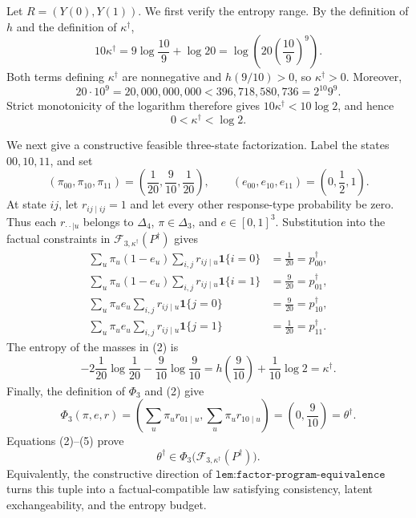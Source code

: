 Let \(R=(Y(0),Y(1))\).  We first verify the entropy range.  By the definition of \(h\) and the definition of \(\kappa^\dagger\),
\[
10\kappa^\dagger
=9\log\frac{10}{9}+\log 20
=\log\!\left(20\left(\frac{10}{9}\right)^9\right).
\]
Both terms defining \(\kappa^\dagger\) are nonnegative and \(h(9/10)>0\), so \(\kappa^\dagger>0\).  Moreover,
\[
20\cdot 10^9=20{,}000{,}000{,}000
<396{,}718{,}580{,}736=2^{10}9^9.
\]
Strict monotonicity of the logarithm therefore gives \(10\kappa^\dagger<10\log 2\), and hence
\[
0<\kappa^\dagger<\log 2.
\tag{1}
\]

We next give a constructive feasible three-state factorization.  Label the states \(00,10,11\), and set
\[
(\pi_{00},\pi_{10},\pi_{11})
=\left(\frac1{20},\frac9{10},\frac1{20}\right),
\qquad
(e_{00},e_{10},e_{11})=\left(0,\frac12,1\right).
\tag{2}
\]
At state \(ij\), let \(r_{ij\mid ij}=1\) and let every other response-type probability be zero.  Thus each \(r_{\cdot\cdot\mid u}\) belongs to \(\Delta_4\), \(\pi\in\Delta_3\), and \(e\in[0,1]^3\).  Substitution into the factual constraints in \(\mathcal F_{3,\kappa^\dagger}(P^\dagger)\) gives
\[
\begin{aligned}
\sum_u\pi_u(1-e_u)\sum_{i,j}r_{ij\mid u}\mathbf 1\{i=0\}
&=\frac1{20}=p^\dagger_{00},\\
\sum_u\pi_u(1-e_u)\sum_{i,j}r_{ij\mid u}\mathbf 1\{i=1\}
&=\frac9{20}=p^\dagger_{01},\\
\sum_u\pi_u e_u\sum_{i,j}r_{ij\mid u}\mathbf 1\{j=0\}
&=\frac9{20}=p^\dagger_{10},\\
\sum_u\pi_u e_u\sum_{i,j}r_{ij\mid u}\mathbf 1\{j=1\}
&=\frac1{20}=p^\dagger_{11}.
\end{aligned}
\tag{3}
\]
The entropy of the masses in (2) is
\[
-2\frac1{20}\log\frac1{20}-\frac9{10}\log\frac9{10}
=h\!\left(\frac9{10}\right)+\frac1{10}\log2
=\kappa^\dagger.
\tag{4}
\]
Finally, the definition of \(\Phi_3\) and (2) give
\[
\Phi_3(\pi,e,r)
=\left(\sum_u\pi_u r_{01\mid u},\sum_u\pi_u r_{10\mid u}\right)
=\left(0,\frac9{10}\right)
=\theta^\dagger.
\tag{5}
\]
Equations (2)--(5) prove
\[
\theta^\dagger\in\Phi_3\bigl(\mathcal F_{3,\kappa^\dagger}(P^\dagger)\bigr).
\tag{6}
\]
Equivalently, the constructive direction of \(\texttt{lem:factor-program-equivalence}\) turns this tuple into a factual-compatible law satisfying consistency, latent exchangeability, and the entropy budget.

